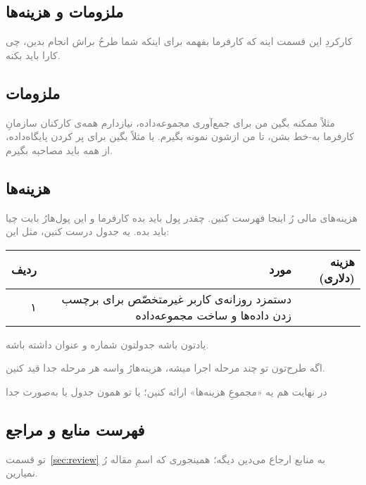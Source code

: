 \documentclass{article}
\begin{document}
\begin{framed}
	\section{ملزومات و هزینه‌ها}
	\textcolor{gray}{کارکردِ این قسمت اینه که کارفرما بفهمه برای اینکه شما طرحُ براش انجام بدین، چی کارا باید بکنه.}
	\subsection{ملزومات}
	\textcolor{gray}{مثلاً ممکنه بگین من برای جمع‌آوری مجموعه‌داده، نیازدارم همه‌ی کارکنان سازمانِ کارفرما به-خط بشن، تا من ازشون نمونه بگیرم. یا مثلاً بگین برای پر کردن پایگاه‌داده، از همه باید مصاحبه بگیرم.}
	\subsection{هزینه‌ها}
	\textcolor{gray}{هزینه‌های مالی رُ اینجا فهرست کنین. چقدر پول باید بده کارفرما و این پول‌هارُ بابت چیا باید بده. یه جدول درست کنین، مثل این:}
	\vskip 0.5cm
	\begin{center}
	\textcolor{gray}{\scriptsize \begin{tabular}{||r|r|r||}\hline \hline ردیف&مورد&هزینه (دلاری)\\ \hline ۱&دستمزد روزانه‌ی کاربر غیرمتخصّص برای برچسب زدن داده‌ها و ساخت مجموعه‌داده\end{tabular}}
	\end{center}
	\vskip 0.5cm
	\textcolor{gray}{یادتون باشه جدولتون شماره و عنوان داشته باشه.}

	\textcolor{gray}{اگه طرح‌تون تو چند مرحله اجرا میشه، هزینه‌هارُ واسه هر مرحله جدا قید کنین.}

	\textcolor{gray}{در نهایت  هم یه «مجموعِ هزینه‌ها» ارائه کنین؛ یا تو همون جدول یا به‌صورت جدا}

\end{framed}
\begin{framed}
	\section{فهرست منابع و مراجع}
	\textcolor{gray}{تو قسمت~\ref{sec:review} به منابع ارجاع می‌دین دیگه؛ همینجوری که اسمِ مقاله رُ نمیارین.}
\end{framed}
\end{document}
